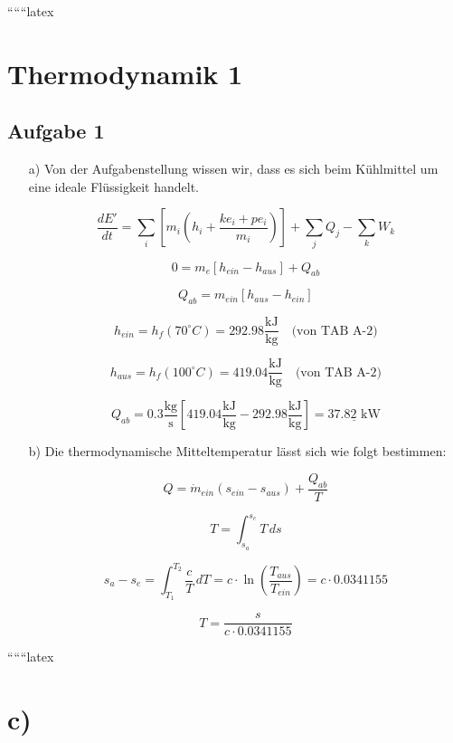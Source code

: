 
``````latex


\section*{Thermodynamik 1}

\subsection*{Aufgabe 1}

\begin{itemize}
    \item[a)] Von der Aufgabenstellung wissen wir, dass es sich beim Kühlmittel um eine ideale Flüssigkeit handelt.
    
    \[
    \frac{dE'}{dt} = \sum_i \left[ m_i \left( h_i + \frac{ke_i + pe_i}{m_i} \right) \right] + \sum_j Q_j - \sum_k W_k
    \]
    
    \[
    0 = m_e \left[ h_{ein} - h_{aus} \right] + Q_{ab}
    \]
    
    \[
    Q_{ab} = m_{ein} \left[ h_{aus} - h_{ein} \right]
    \]
    
    \[
    h_{ein} = h_f (70^\circ C) = 292.98 \frac{\text{kJ}}{\text{kg}} \quad \text{(von TAB A-2)}
    \]
    
    \[
    h_{aus} = h_f (100^\circ C) = 419.04 \frac{\text{kJ}}{\text{kg}} \quad \text{(von TAB A-2)}
    \]
    
    \[
    Q_{ab} = 0.3 \frac{\text{kg}}{\text{s}} \left[ 419.04 \frac{\text{kJ}}{\text{kg}} - 292.98 \frac{\text{kJ}}{\text{kg}} \right] = \underline{37.82 \text{ kW}}
    \]
    
    \item[b)] Die thermodynamische Mitteltemperatur lässt sich wie folgt bestimmen:
    
    \[
    Q = \dot{m}_{ein} \left( s_{ein} - s_{aus} \right) + \frac{Q_{ab}}{T}
    \]
    
    \[
    T = \int_{s_a}^{s_e} T \, ds
    \]
    
    \[
    s_a - s_e = \int_{T_1}^{T_2} \frac{c}{T} \, dT = c \cdot \ln \left( \frac{T_{aus}}{T_{ein}} \right) = c \cdot 0.0341155
    \]
    
    \[
    T = \frac{s}{c \cdot 0.0341155}
    \]
    
\end{itemize}

``````latex


\section*{c)}

